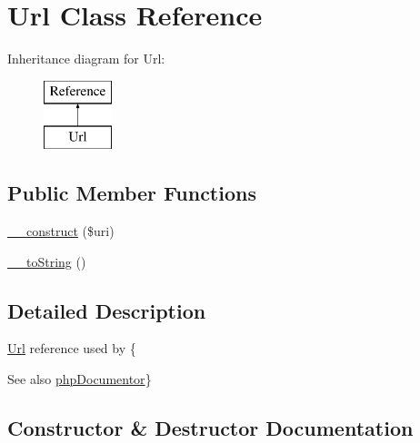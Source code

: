 \hypertarget{classphp_documentor_1_1_reflection_1_1_doc_block_1_1_tags_1_1_reference_1_1_url}{}\section{Url Class Reference}
\label{classphp_documentor_1_1_reflection_1_1_doc_block_1_1_tags_1_1_reference_1_1_url}
Inheritance diagram for Url\+:\begin{figure}[H]
\begin{center}
\leavevmode
\includegraphics[height=2.000000cm]{classphp_documentor_1_1_reflection_1_1_doc_block_1_1_tags_1_1_reference_1_1_url}
\end{center}
\end{figure}
\subsection*{Public Member Functions}
\begin{DoxyCompactItemize}
\item 
\mbox{\hyperlink{classphp_documentor_1_1_reflection_1_1_doc_block_1_1_tags_1_1_reference_1_1_url_abf611f10975280ecab7006831e3b5c4d}{\+\_\+\+\_\+construct}} (\$uri)
\item 
\mbox{\hyperlink{classphp_documentor_1_1_reflection_1_1_doc_block_1_1_tags_1_1_reference_1_1_url_a7516ca30af0db3cdbf9a7739b48ce91d}{\+\_\+\+\_\+to\+String}} ()
\end{DoxyCompactItemize}


\subsection{Detailed Description}
\mbox{\hyperlink{classphp_documentor_1_1_reflection_1_1_doc_block_1_1_tags_1_1_reference_1_1_url}{Url}} reference used by \{\begin{DoxySeeAlso}{See also}
\mbox{\hyperlink{namespacephp_documentor}{php\+Documentor}}\} 
\end{DoxySeeAlso}


\subsection{Constructor \& Destructor Documentation}
\mbox{\label{classphp_documentor_1_1_reflection_1_1_doc_block_1_1_tags_1_1_reference_1_1_url_abf611f10975280ecab7006831e3b5c4d}} 
